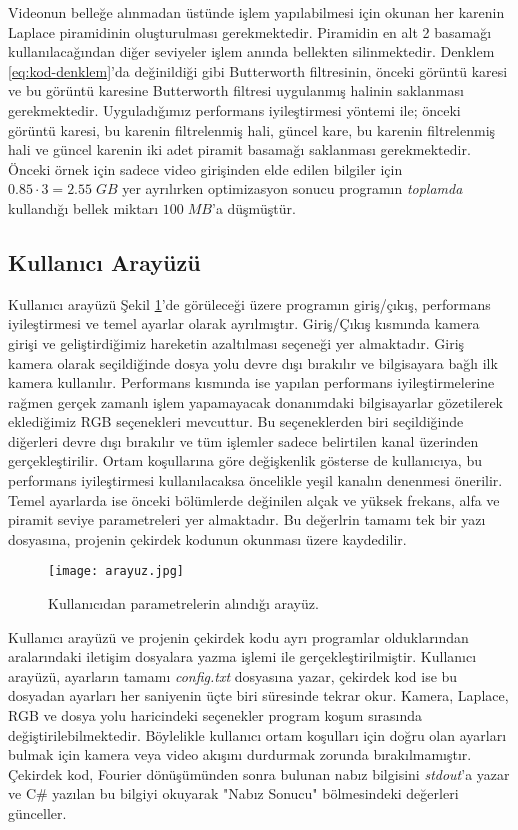 \documentclass[a4paper, 12pt]{article}
\begin{document}
Videonun belleğe alınmadan üstünde işlem yapılabilmesi için okunan her karenin Laplace piramidinin oluşturulması gerekmektedir. Piramidin en alt 2 basamağı kullanılacağından diğer seviyeler işlem anında bellekten silinmektedir. Denklem \ref{eq:kod-denklem}'da değinildiği gibi Butterworth filtresinin, önceki görüntü karesi ve bu görüntü karesine Butterworth filtresi uygulanmış halinin saklanması gerekmektedir. Uyguladığımız performans iyileştirmesi yöntemi ile; önceki görüntü karesi, bu karenin filtrelenmiş hali, güncel kare, bu karenin filtrelenmiş hali ve güncel karenin iki adet piramit basamağı saklanması gerekmektedir. Önceki örnek için sadece video girişinden elde edilen bilgiler için $0.85\cdot3=2.55\; GB$ yer ayrılırken optimizasyon sonucu programın \textit{toplamda} kullandığı bellek miktarı $100\;MB$'a düşmüştür. 


\subsection{Kullanıcı Arayüzü}

Kullanıcı arayüzü Şekil \ref{fig:arayuz}'de görüleceği üzere programın giriş/çıkış, performans iyileştirmesi ve temel ayarlar olarak ayrılmıştır. Giriş/Çıkış kısmında kamera girişi ve geliştirdiğimiz hareketin azaltılması seçeneği yer almaktadır. Giriş kamera olarak seçildiğinde dosya yolu devre dışı bırakılır ve bilgisayara bağlı ilk kamera kullanılır. Performans kısmında ise yapılan performans iyileştirmelerine rağmen gerçek zamanlı işlem yapamayacak donanımdaki bilgisayarlar gözetilerek eklediğimiz RGB seçenekleri mevcuttur. Bu seçeneklerden biri seçildiğinde diğerleri devre dışı bırakılır ve tüm işlemler sadece belirtilen kanal üzerinden gerçekleştirilir. Ortam koşullarına göre değişkenlik gösterse de kullanıcıya, bu performans iyileştirmesi kullanılacaksa öncelikle yeşil kanalın denenmesi önerilir. Temel ayarlarda ise önceki bölümlerde değinilen alçak ve yüksek frekans, alfa ve piramit seviye parametreleri yer almaktadır. Bu değerlrin tamamı tek bir yazı dosyasına, projenin çekirdek kodunun okunması üzere kaydedilir.

\begin{figure}[h]
	\centering
	\texttt{[image: arayuz.jpg]}
	\caption{Kullanıcıdan parametrelerin alındığı arayüz.}
	\label{fig:arayuz}
\end{figure}


Kullanıcı arayüzü ve projenin çekirdek kodu ayrı programlar olduklarından aralarındaki iletişim dosyalara yazma işlemi ile gerçekleştirilmiştir. Kullanıcı arayüzü, ayarların tamamı \textit{config.txt} dosyasına yazar, çekirdek kod ise bu dosyadan ayarları her saniyenin üçte biri süresinde tekrar okur. Kamera, Laplace, RGB ve dosya yolu haricindeki seçenekler program koşum sırasında değiştirilebilmektedir. Böylelikle kullanıcı ortam koşulları için doğru olan ayarları bulmak için kamera veya video akışını durdurmak zorunda bırakılmamıştır. Çekirdek kod, Fourier dönüşümünden sonra bulunan nabız bilgisini \textit{stdout}'a yazar ve C\# yazılan bu bilgiyi okuyarak "Nabız Sonucu" bölmesindeki değerleri günceller. 
\end{document}
